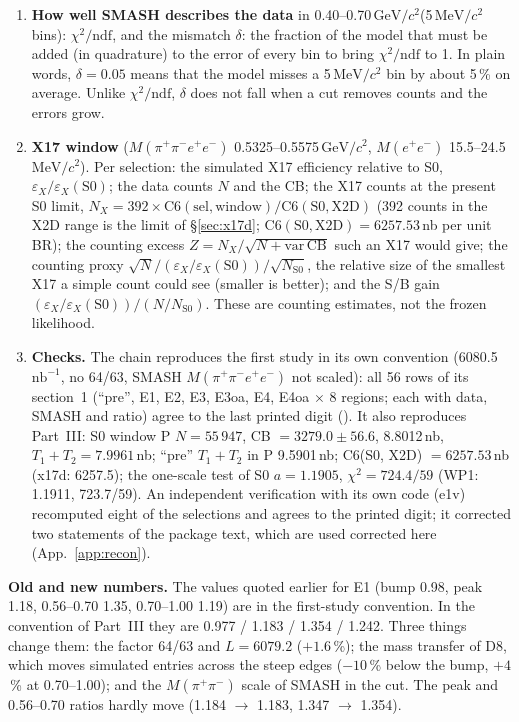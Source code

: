 \documentclass[11pt,a4paper]{article}
\newcommand{\Mfour}{\ensuremath{M(\pi^{+}\pi^{-}e^{+}e^{-})}\xspace}
\newcommand{\Mee}{\ensuremath{M(e^{+}e^{-})}\xspace}
\newcommand{\Mpipi}{\ensuremath{M(\pi^{+}\pi^{-})}\xspace}
\newcommand{\nbinv}{\ensuremath{\mathrm{nb}^{-1}}\xspace}
\newcommand{\GeVcc}{\ensuremath{\mathrm{GeV}/c^{2}}\xspace}
\newcommand{\MeVcc}{\ensuremath{\mathrm{MeV}/c^{2}}\xspace}
\newcommand{\code}[1]{\texttt{\detokenize{#1}}}
\newcommand{\cs}[1]{\textsf{#1}}%
\begin{document}
\begin{enumerate}
\item \textbf{How well SMASH describes the data} in 0.40--0.70\,\GeVcc (5\,\MeVcc bins): $\chi^2/\mathrm{ndf}$, and the mismatch $\delta$: the
      fraction of the model that must be added (in quadrature) to the error of every bin to bring $\chi^2/\mathrm{ndf}$ to 1. In plain words,
      $\delta=0.05$ means that the model misses a 5\,\MeVcc bin by about 5\,\% on average. Unlike $\chi^2/\mathrm{ndf}$, $\delta$ does not fall when
      a cut removes counts and the errors grow.
\item \textbf{X17 window} (\Mfour 0.5325--0.5575\,\GeVcc, \Mee 15.5--24.5\,\MeVcc). Per selection: the simulated X17 efficiency relative to S0,
      $\varepsilon_X/\varepsilon_X(\mathrm{S0})$; the data counts $N$ and the CB; the X17 counts at the present S0 limit,
      $N_X=392\times\mathrm{C6}(\mathrm{sel},\mathrm{window})/\mathrm{C6}(\mathrm{S0},\mathrm{X2D})$ (392 counts in the X2D range is the limit of
      \S\ref{sec:x17d}; $\mathrm{C6}(\mathrm{S0},\mathrm{X2D})=6257.53$\,nb per unit BR); the counting excess $Z=N_X/\sqrt{N+\mathrm{var\,CB}}$
      such an X17 would give; the counting proxy $\sqrt{N}/(\varepsilon_X/\varepsilon_X(\mathrm{S0}))/\sqrt{N_{\mathrm{S0}}}$, the relative size of
      the smallest X17 a simple count could see (smaller is better); and the S/B gain $(\varepsilon_X/\varepsilon_X(\mathrm{S0}))/(N/N_{\mathrm{S0}})$.
      These are counting estimates, not the frozen likelihood.
\item \textbf{Checks.} The chain reproduces the first study in its own convention (6080.5\,\nbinv, no 64/63, SMASH \Mfour not scaled): all 56
      rows of its section~1 (``pre'', \cs{E1}, \cs{E2}, \cs{E3}, \cs{E3oa}, \cs{E4}, \cs{E4oa} $\times$ 8 regions; each with data, SMASH and ratio) agree to the
      last printed digit (\code{tables_all/e1_repro.txt}). It also reproduces Part~III: S0 window P $N=55\,947$, CB $=3279.0\pm56.6$, 8.8012\,nb, $T_1+T_2=7.9961$\,nb; ``pre''
      $T_1+T_2$ in P 9.5901\,nb; C6(S0, X2D) $=6257.53$\,nb (x17d: 6257.5); the one-scale test of S0 $a=1.1905$, $\chi^2=724.4/59$ (WP1: 1.1911,
      723.7/59). An independent verification with its own code (e1v) recomputed eight of the selections and agrees to the printed digit;
      it corrected two statements of the package text, which are used corrected here (App.~\ref{app:recon}).
\end{enumerate}

\textbf{Old and new numbers.} The values quoted earlier for \cs{E1} (bump 0.98, peak 1.18, 0.56--0.70 1.35, 0.70--1.00 1.19) are in the
first-study convention. In the convention of Part~III they are 0.977 / 1.183 / 1.354 / 1.242. Three things change them: the factor 64/63 and
$L=6079.2$ ($+1.6$\,\%); the mass transfer of D8, which moves simulated entries across the steep edges ($-10$\,\% below the bump, $+4$\,\% at
0.70--1.00); and the \Mpipi scale of SMASH in the cut. The peak and 0.56--0.70 ratios hardly move (1.184 $\to$ 1.183, 1.347 $\to$ 1.354).
\end{document}
